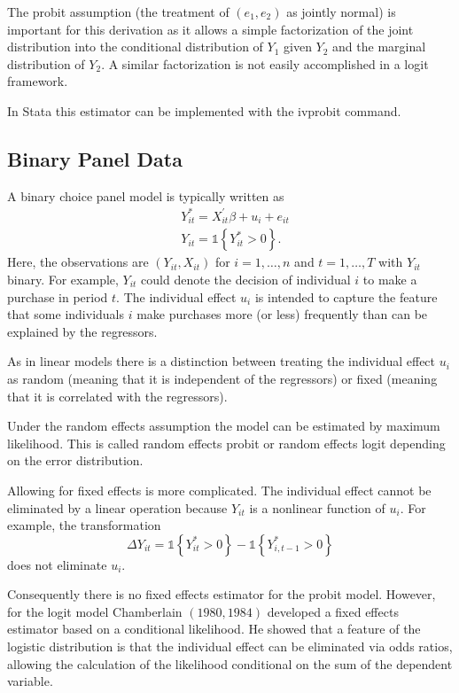 \documentclass[10pt]{article}
\begin{document}
The probit assumption (the treatment of $\left(e_{1}, e_{2}\right)$ as jointly normal) is important for this derivation as it allows a simple factorization of the joint distribution into the conditional distribution of $Y_{1}$ given $Y_{2}$ and the marginal distribution of $Y_{2}$. A similar factorization is not easily accomplished in a logit framework.

In Stata this estimator can be implemented with the ivprobit command.

\subsection{Binary Panel Data}
A binary choice panel model is typically written as
$$
\begin{aligned}
&Y_{i t}^{*}=X_{i t}^{\prime} \beta+u_{i}+e_{i t} \\
&Y_{i t}=\mathbb{1}\left\{Y_{i t}^{*}>0\right\} .
\end{aligned}
$$
Here, the observations are $\left(Y_{i t}, X_{i t}\right)$ for $i=1, \ldots, n$ and $t=1, \ldots, T$ with $Y_{i t}$ binary. For example, $Y_{i t}$ could denote the decision of individual $i$ to make a purchase in period $t$. The individual effect $u_{i}$ is intended to capture the feature that some individuals $i$ make purchases more (or less) frequently than can be explained by the regressors.

As in linear models there is a distinction between treating the individual effect $u_{i}$ as random (meaning that it is independent of the regressors) or fixed (meaning that it is correlated with the regressors).

Under the random effects assumption the model can be estimated by maximum likelihood. This is called random effects probit or random effects logit depending on the error distribution.

Allowing for fixed effects is more complicated. The individual effect cannot be eliminated by a linear operation because $Y_{i t}$ is a nonlinear function of $u_{i}$. For example, the transformation
$$
\Delta Y_{i t}=\mathbb{1}\left\{Y_{i t}^{*}>0\right\}-\mathbb{1}\left\{Y_{i, t-1}^{*}>0\right\}
$$
does not eliminate $u_{i}$.

Consequently there is no fixed effects estimator for the probit model. However, for the logit model Chamberlain $(1980,1984)$ developed a fixed effects estimator based on a conditional likelihood. He showed that a feature of the logistic distribution is that the individual effect can be eliminated via odds ratios, allowing the calculation of the likelihood conditional on the sum of the dependent variable.
\end{document}
